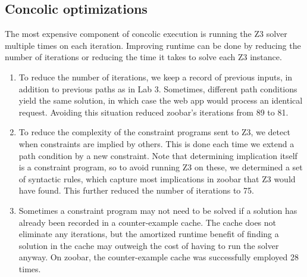 \documentclass{scrartcl}
\begin{document}
\subsection{Concolic optimizations}

The most expensive component of concolic execution is running the Z3
solver multiple times on each iteration. Improving runtime can be done
by reducing the number of iterations or reducing the time it takes to
solve each Z3 instance.

\begin{enumerate}
\item To reduce the number of iterations, we keep a record of previous
  inputs, in addition to previous paths as in Lab 3. Sometimes,
  different path conditions yield the same solution, in which case
  the web app would process an identical request. Avoiding this
  situation reduced zoobar's iterations from 89 to 81.

\item To reduce the complexity of the constraint programs sent to Z3,
  we detect when constraints are implied by others. This is done each
  time we extend a path condition by a new constraint. Note that
  determining implication itself is a constraint program, so to avoid
  running Z3 on these, we determined a set of syntactic rules, which
  capture most implications in zoobar that Z3 would have found. This
  further reduced the number of iterations to 75.

\item Sometimes a constraint program may not need to be solved if a
  solution has already been recorded in a counter-example cache. The
  cache does not eliminate any iterations, but the amortized runtime
  benefit of finding a solution in the cache may outweigh the cost of
  having to run the solver anyway. On zoobar, the counter-example
  cache was successfully employed 28 times.
\end{enumerate}
\end{document}
